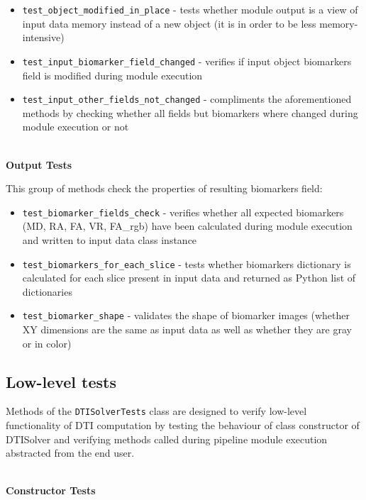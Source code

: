 \begin{itemize}
	\item 
	\texttt{test\_object\_modified\_in\_place} - tests whether module output is a view of input data memory instead of a new object (it is in order to be less memory-intensive)
	
	\item
	\texttt{test\_input\_biomarker\_field\_changed} - verifies if input object biomarkers field is modified during module execution
	
	\item 
	\texttt{test\_input\_other\_fields\_not\_changed} - compliments the aforementioned methods by checking whether all fields but biomarkers where changed during module execution or not	 
\end{itemize}

\hfill\\
\textbf{Output Tests}
\hfill

This group of methods check the properties of resulting biomarkers field:

\begin{itemize}
	\item 
	\texttt{test\_biomarker\_fields\_check} - verifies whether all expected biomarkers (MD, RA, FA, VR, FA\_rgb) have been calculated during module execution and written to input data class instance
	
	\item 
	\texttt{test\_biomarkers\_for\_each\_slice} - tests whether biomarkers dictionary is calculated for each slice present in input data and returned as Python list of dictionaries
	
	\item 
	\texttt{test\_biomarker\_shape} - validates the shape of biomarker images (whether XY dimensions are the same as input data as well as whether they are gray or in color)
\end{itemize}

\subsection{Low-level tests}

Methods of the \texttt{DTISolverTests} class are designed to verify low-level functionality of DTI computation by testing the behaviour of class constructor of DTISolver and verifying methods called during pipeline module execution abstracted from the end user.

\hfill\\
\textbf{Constructor Tests}
\hfill

